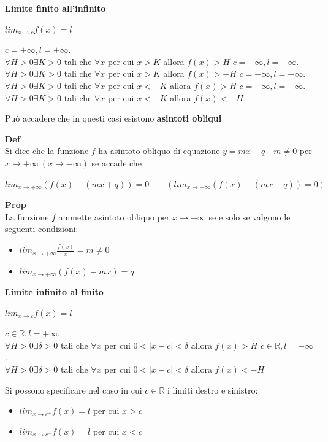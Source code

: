 \documentclass[12pt, a4paper]{article}
\begin{document}
    \textbf{Limite finito all'infinito}
    \begin{center}
        $lim_{x\to c}f(x)=l$
    \end{center}
    \subitem $c=+\infty, l=+\infty$.\\$\forall H>0 \exists K>0$ tali che $\forall x$ per
cui $x>K$ allora $f(x)>H$
\subitem $c=+\infty, l=-\infty$.\\$\forall H>0 \exists K>0$ tali che $\forall x$ per
    cui $x>K$ allora $f(x)>-H$
    \subitem $c=-\infty, l=+\infty$.\\$\forall H>0 \exists K>0$ tali che $\forall x$ per
cui $x<-K$ allora $f(x)>H$
\subitem $c=-\infty, l=-\infty$.\\$\forall H>0 \exists K>0$ tali che $\forall x$ per
    cui $x<-K$ allora $f(x)<-H$

    Può accadere che in questi casi esistono \textbf{asintoti obliqui}

    \textbf{Def}\\Si dice che la funzione $f$ ha asintoto obliquo di equazione $y=mx+q\quad m\neq 0$ per
$x\to+\infty\ (x\to-\infty)$ se accade che
    \begin{center}
        $lim_{x\to+\infty}(f(x)-(mx+q))=0\qquad(lim_{x\to-\infty}(f(x)-(mx+q))=0)$
    \end{center}

    \textbf{Prop}\\La funzione $f$ ammette asintoto obliquo per $x\to+\infty$ se e solo se valgono
    le seguenti condizioni:
    \begin{itemize}
        \item $lim_{x\to+\infty}\frac{f(x)}{x}=m\neq 0$
        \item $lim_{x\to+\infty}(f(x)-mx)=q$
    \end{itemize}

    \textbf{Limite infinito al finito}
    \begin{center}
        $lim_{x\to c}f(x)=l$
    \end{center}
    \subitem $c\in\mathbb{R}, l=+\infty$.\\$\forall H>0 \exists \delta>0$ tali che $\forall x$ per
cui $0<|x-c|<\delta$ allora $f(x)>H$
\subitem $c\in\mathbb{R}, l=-\infty$.\\$\forall H>0 \exists \delta>0$ tali che $\forall x$ per
    cui $0<|x-c|<\delta$ allora $f(x)<-H$

    Si possono specificare nel caso in cui $c\in\mathbb{R}$ i limiti destro e sinistro:
    \begin{itemize}
        \item $lim_{x\to c^{+}}f(x)=l$ per cui $x>c$
        \item $lim_{x\to c^{-}}f(x)=l$ per cui $x<c$
    \end{itemize}
\end{document}
